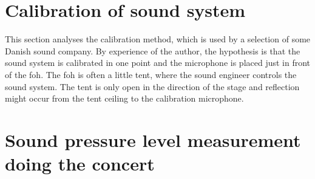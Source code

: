 \section{Calibration of sound system}
This section analyses the calibration method, which is used by a selection of some Danish sound company. By experience of the author, the hypothesis is that the sound system is calibrated in one point and the microphone is placed just in front of the \gls{foh}. The \gls{foh} is often a little tent, where the sound engineer controls the sound system. The tent is only open in the direction of the stage and reflection might occur from the tent ceiling to the calibration microphone. 

\section{Sound pressure level measurement doing the concert}
